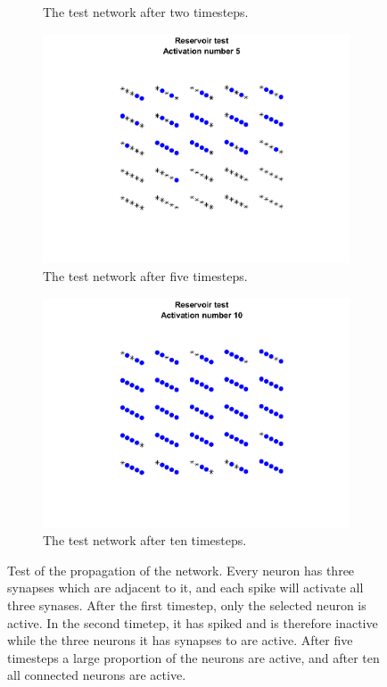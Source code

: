 \begin{figure}
\begin{subfigure}[b]{0.225\textwidth}
        \caption{The test network after two timesteps.}
    \end{subfigure}
    \begin{subfigure}[b]{0.225\textwidth}
        \includegraphics[width=\textwidth]{Images/Reservoir_test_Activation_number_5.png}
        \caption{The test network after five timesteps.}
    \end{subfigure}
     \begin{subfigure}[b]{0.225\textwidth}
        \includegraphics[width=\textwidth]{Images/Reservoir_test_Activation_number_10.png}
        \caption{The test network after ten timesteps.}
    \end{subfigure}
    \caption{Test of the propagation of the network. Every neuron has three synapses which are adjacent to it, and each spike will activate all three synases. After the first timestep, only the selected neuron is active. In the second timetep, it has spiked and is therefore inactive while the three neurons it has synapses to are active. After five timesteps a large proportion of the neurons are active, and after ten all connected neurons are active.}
    \label{fig:implementation_test}
\end{figure}

